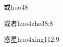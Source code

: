\begin{verbete}{或}{huo4}{8}
\end{verbete}

\begin{verbete}{或者}{huo4zhe3}{8;8}
\end{verbete}

\begin{verbete}{惑星}{huo4xing1}{12;9}
\end{verbete}

